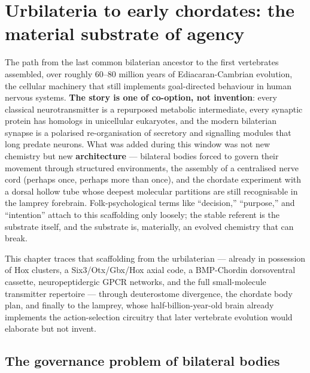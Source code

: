 ﻿\section{Urbilateria to early chordates: the material substrate of agency}\label{04_urbilateria-urbilateria-to-early-chordates-the-material-substrate-of-agency}

The path from the last common bilaterian ancestor to the first vertebrates assembled, over roughly 60--80 million years of Ediacaran-Cambrian evolution, the cellular machinery that still implements goal-directed behaviour in human nervous systems. \textbf{The story is one of co-option, not invention}: every classical neurotransmitter is a repurposed metabolic intermediate, every synaptic protein has homologs in unicellular eukaryotes, and the modern bilaterian synapse is a polarised re-organisation of secretory and signalling modules that long predate neurons. What was added during this window was not new chemistry but new \textbf{architecture} --- bilateral bodies forced to govern their movement through structured environments, the assembly of a centralised nerve cord (perhaps once, perhaps more than once), and the chordate experiment with a dorsal hollow tube whose deepest molecular partitions are still recognisable in the lamprey forebrain. Folk-psychological terms like ``decision,'' ``purpose,'' and ``intention'' attach to this scaffolding only loosely; the stable referent is the substrate itself, and the substrate is, materially, an evolved chemistry that can break.

This chapter traces that scaffolding from the urbilaterian --- already in possession of Hox clusters, a Six3/Otx/Gbx/Hox axial code, a BMP-Chordin dorsoventral cassette, neuropeptidergic GPCR networks, and the full small-molecule transmitter repertoire --- through deuterostome divergence, the chordate body plan, and finally to the lamprey, whose half-billion-year-old brain already implements the action-selection circuitry that later vertebrate evolution would elaborate but not invent.

\subsection{The governance problem of bilateral bodies}\label{04_urbilateria-the-governance-problem-of-bilateral-bodies}

